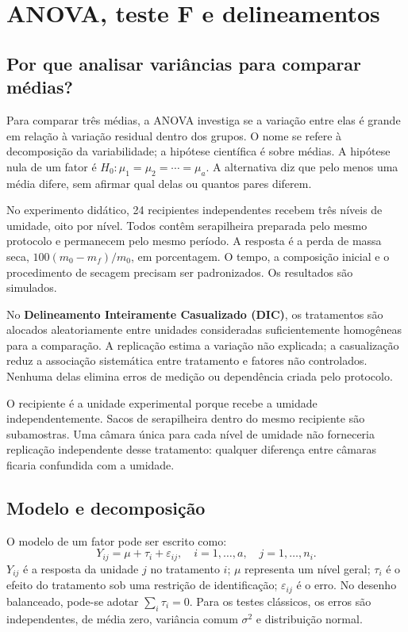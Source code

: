 \chapter{ANOVA, teste F e delineamentos}

\section{Por que analisar variâncias para comparar médias?}
Para comparar três médias, a ANOVA investiga se a variação entre elas é grande em relação à variação residual dentro dos grupos. O nome se refere à decomposição da variabilidade; a hipótese científica é sobre médias. A hipótese nula de um fator é $H_0:\mu_1=\mu_2=\cdots=\mu_a$. A alternativa diz que pelo menos uma média difere, sem afirmar qual delas ou quantos pares diferem.

No experimento didático, 24 recipientes independentes recebem três níveis de umidade, oito por nível. Todos contêm serapilheira preparada pelo mesmo protocolo e permanecem pelo mesmo período. A resposta é a perda de massa seca, $100(m_0-m_f)/m_0$, em porcentagem. O tempo, a composição inicial e o procedimento de secagem precisam ser padronizados. Os resultados são simulados.

\begin{conceito}
No \textbf{Delineamento Inteiramente Casualizado (DIC)}, os tratamentos são alocados aleatoriamente entre unidades consideradas suficientemente homogêneas para a comparação. A replicação estima a variação não explicada; a casualização reduz a associação sistemática entre tratamento e fatores não controlados. Nenhuma delas elimina erros de medição ou dependência criada pelo protocolo.
\end{conceito}

O recipiente é a unidade experimental porque recebe a umidade independentemente. Sacos de serapilheira dentro do mesmo recipiente são subamostras. Uma câmara única para cada nível de umidade não forneceria replicação independente desse tratamento: qualquer diferença entre câmaras ficaria confundida com a umidade.

\section{Modelo e decomposição}
O modelo de um fator pode ser escrito como:
\begin{equation}Y_{ij}=\mu+\tau_i+\varepsilon_{ij},
\quad i=1,\ldots,a,\quad j=1,\ldots,n_i.\end{equation}
$Y_{ij}$ é a resposta da unidade $j$ no tratamento $i$; $\mu$ representa um nível geral; $\tau_i$ é o efeito do tratamento sob uma restrição de identificação; $\varepsilon_{ij}$ é o erro. No desenho balanceado, pode-se adotar $\sum_i\tau_i=0$. Para os testes clássicos, os erros são independentes, de média zero, variância comum $\sigma^2$ e distribuição normal.

